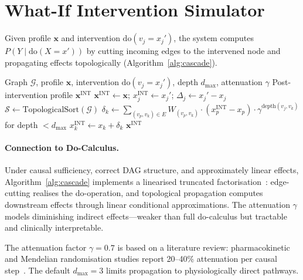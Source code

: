 \documentclass[runningheads]{llncs}
\begin{document}
\section{What-If Intervention Simulator}\label{sec:whatif}

Given profile $\mathbf{x}$ and intervention
$\mathrm{do}(v_j = x_j')$, the system computes
$P(Y \mid \mathrm{do}(X = x'))$ by cutting incoming edges to the
intervened node and propagating effects topologically
(Algorithm~\ref{alg:cascade}).

\begin{algorithm}[t]
\caption{Topological Intervention Cascade}
\label{alg:cascade}
\begin{algorithmic}[1]
\REQUIRE Graph $\mathcal{G}$, profile $\mathbf{x}$, intervention
  $\mathrm{do}(v_j = x_j')$, depth $d_{\max}$, attenuation $\gamma$
\ENSURE Post-intervention profile $\mathbf{x}^{\mathrm{INT}}$
\STATE $\mathbf{x}^{\mathrm{INT}} \leftarrow \mathbf{x}$;
  $x_j^{\mathrm{INT}} \leftarrow x_j'$;
  $\Delta_j \leftarrow x_j' - x_j$
\STATE $\mathcal{S} \leftarrow \text{TopologicalSort}(\mathcal{G})$
  \STATE $\delta_k \leftarrow \sum_{(v_p, v_k) \in E} W_{(v_p,v_k)} \cdot (x_p^{\mathrm{INT}} - x_p) \cdot \gamma^{\text{depth}(v_j,v_k)}$ for depth $< d_{\max}$
  \STATE $x_k^{\mathrm{INT}} \leftarrow x_k + \delta_k$
\ENDFOR
\RETURN $\mathbf{x}^{\mathrm{INT}}$
\end{algorithmic}
\end{algorithm}

\paragraph{Connection to Do-Calculus.}
Under causal sufficiency, correct DAG structure, and approximately
linear effects, Algorithm~\ref{alg:cascade} implements a linearised
truncated factorisation~\cite{pearl2009causality}: edge-cutting
realises the do-operation, and topological propagation computes
downstream effects through linear conditional approximations.
The attenuation $\gamma$ models diminishing indirect effects---weaker
than full do-calculus but tractable and clinically interpretable.

The attenuation factor $\gamma = 0.7$ is based on a literature review:
pharmacokinetic and Mendelian randomisation studies report 20--40\%
attenuation per causal step~\cite{ctt2010,pearl2009causality}.
The default $d_{\max} = 3$ limits propagation to physiologically
direct pathways.
\end{document}
